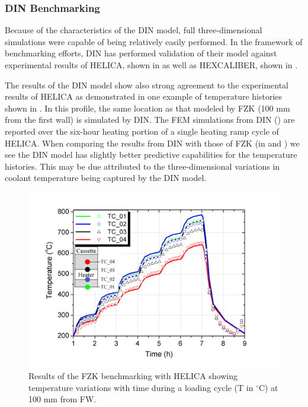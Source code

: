 \subsubsection{DIN Benchmarking}
Because of the characteristics of the DIN model, full three-dimensional simulations were capable of being relatively easily performed. In the framework of benchmarking efforts, DIN has performed validation of their model against experimental results of HELICA, shown in  as well as HEXCALIBER, shown in .

The results of the DIN model show also strong agreement to the experimental results of HELICA as demonstrated in one example of temperature histories shown in . In this profile, the same location as that modeled by FZK (100 mm from the first wall) is simulated by DIN. The FEM simulations from DIN () are reported over the six-hour heating portion of a single heating ramp cycle of HELICA. When comparing the results from DIN with those of FZK (in  and ) we see the DIN model has slightly better predictive capabilities for the temperature histories. This may be due attributed to the three-dimensional variations in coolant temperature being captured by the DIN model. 


\begin{figure}[t!]
\centering
\includegraphics[width=\singleimagewidth]{figures/Fig-6}
\caption{Results of the FZK benchmarking with HELICA\cite{Gan:2009vn} showing temperature variations with time during a loading cycle (T in $^\circ$C) at 100 mm from FW.}\label{fig:FZK_HELICAa}
\end{figure}

